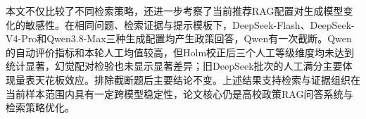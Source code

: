 本文不仅比较了不同检索策略，还进一步考察了当前推荐RAG配置对生成模型变化的敏感性。在相同问题、检索证据与提示模板下，DeepSeek-Flash、DeepSeek-V4-Pro和Qwen3.8-Max三种生成配置均产生政策回答，Qwen有一次截断。Qwen的自动评价指标和本轮人工均值较高，但Holm校正后三个人工等级维度均未达到统计显著，幻觉配对检验也未显示显著差异；旧DeepSeek批次的人工满分主要体现量表天花板效应。排除截断题后主要结论不变。上述结果支持检索与证据组织在当前样本范围内具有一定跨模型稳定性，论文核心仍是高校政策RAG问答系统与检索策略优化。
